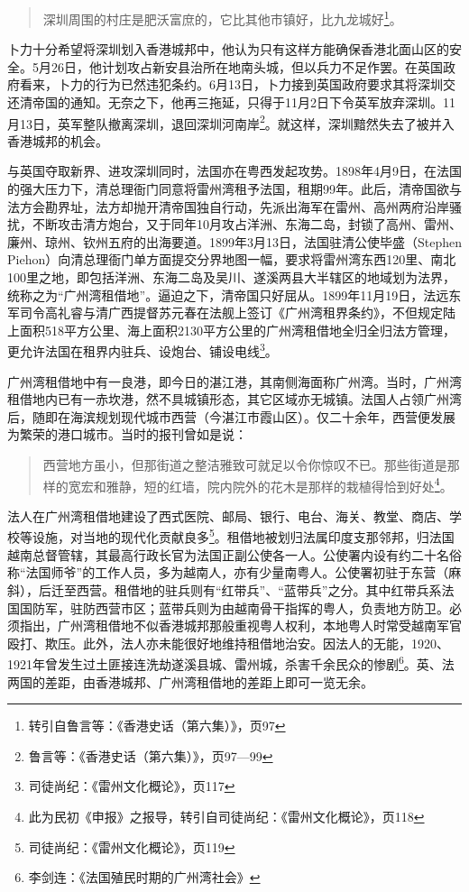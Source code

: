 \begin{quote}

深圳周围的村庄是肥沃富庶的，它比其他市镇好，比九龙城好\footnote{转引自鲁言等：《香港史话（第六集）》，页97}。

\end{quote}

卜力十分希望将深圳划入香港城邦中，他认为只有这样方能确保香港北面山区的安全。5月26日，他计划攻占新安县治所在地南头城，但以兵力不足作罢。在英国政府看来，卜力的行为已然违犯条约。6月13日，卜力接到英国政府要求其将深圳交还清帝国的通知。无奈之下，他再三拖延，只得于11月2日下令英军放弃深圳。11月13日，英军整队撤离深圳，退回深圳河南岸\footnote{鲁言等：《香港史话（第六集）》，页97—99}。就这样，深圳黯然失去了被并入香港城邦的机会。

与英国夺取新界、进攻深圳同时，法国亦在粤西发起攻势。1898年4月9日，在法国的强大压力下，清总理衙门同意将雷州湾租予法国，租期99年。此后，清帝国欲与法方会勘界址，法方却抛开清帝国独自行动，先派出海军在雷州、高州两府沿岸骚扰，不断攻击清方炮台，又于同年10月攻占洋洲、东海二岛，封锁了高州、雷州、廉州、琼州、钦州五府的出海要道。1899年3月13日，法国驻清公使毕盛（Stephen Piehon）向清总理衙门单方面提交分界地图一幅，要求将雷州湾东西120里、南北100里之地，即包括洋洲、东海二岛及吴川、遂溪两县大半辖区的地域划为法界，统称之为“广州湾租借地”。逼迫之下，清帝国只好屈从。1899年11月19日，法远东军司令高礼睿与清广西提督苏元春在法舰上签订《广州湾租界条约》，不但规定陆上面积518平方公里、海上面积2130平方公里的广州湾租借地全归全归法方管理，更允许法国在租界内驻兵、设炮台、铺设电线\footnote{司徒尚纪：《雷州文化概论》，页117}。

广州湾租借地中有一良港，即今日的湛江港，其南侧海面称广州湾。当时，广州湾租借地内已有一赤坎港，然不具城镇形态，其它区域亦无城镇。法国人占领广州湾后，随即在海滨规划现代城市西营（今湛江市霞山区）。仅二十余年，西营便发展为繁荣的港口城市。当时的报刊曾如是说：


\begin{quote}

西营地方虽小，但那街道之整洁雅致可就足以令你惊叹不已。那些街道是那样的宽宏和雅静，短的红墙，院内院外的花木是那样的栽植得恰到好处\footnote{此为民初《申报》之报导，转引自司徒尚纪：《雷州文化概论》，页118}。

\end{quote}

法人在广州湾租借地建设了西式医院、邮局、银行、电台、海关、教堂、商店、学校等设施，对当地的现代化贡献良多\footnote{司徒尚纪：《雷州文化概论》，页119}。租借地被划归法属印度支那邻邦，归法国越南总督管辖，其最高行政长官为法国正副公使各一人。公使署内设有约二十名俗称“法国师爷”的工作人员，多为越南人，亦有少量南粤人。公使署初驻于东营（麻斜），后迁至西营。租借地的驻兵则有“红带兵”、“蓝带兵”之分。其中红带兵系法国国防军，驻防西营市区；蓝带兵则为由越南骨干指挥的粤人，负责地方防卫。必须指出，广州湾租借地不似香港城邦那般重视粤人权利，本地粤人时常受越南军官殴打、欺压。此外，法人亦未能很好地维持租借地治安。因法人的无能，1920、1921年曾发生过土匪接连洗劫遂溪县城、雷州城，杀害千余民众的惨剧\footnote{李剑连：《法国殖民时期的广州湾社会》}。英、法两国的差距，由香港城邦、广州湾租借地的差距上即可一览无余。


